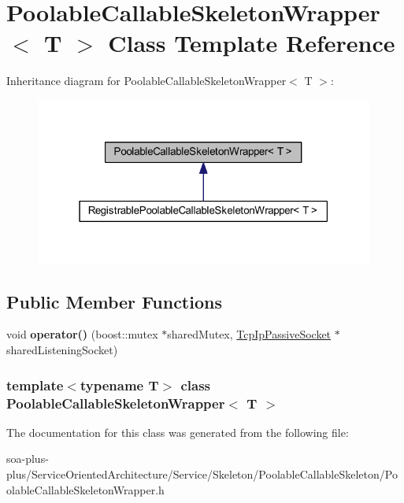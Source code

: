 \hypertarget{class_poolable_callable_skeleton_wrapper}{
\section{PoolableCallableSkeletonWrapper$<$ T $>$ Class Template Reference}
\label{class_poolable_callable_skeleton_wrapper}
}


Inheritance diagram for PoolableCallableSkeletonWrapper$<$ T $>$:\nopagebreak
\begin{figure}[H]
\begin{center}
\leavevmode
\includegraphics[width=316pt]{class_poolable_callable_skeleton_wrapper__inherit__graph}
\end{center}
\end{figure}
\subsection*{Public Member Functions}
\begin{DoxyCompactItemize}
\item 
\hypertarget{class_poolable_callable_skeleton_wrapper_a32cc7b11ded2f63bc833dbc349a72549}{
void {\bfseries operator()} (boost::mutex $\ast$sharedMutex, \hyperlink{class_tcp_ip_passive_socket}{TcpIpPassiveSocket} $\ast$sharedListeningSocket)}
\label{class_poolable_callable_skeleton_wrapper_a32cc7b11ded2f63bc833dbc349a72549}

\end{DoxyCompactItemize}
\subsubsection*{template$<$typename T$>$ class PoolableCallableSkeletonWrapper$<$ T $>$}



The documentation for this class was generated from the following file:\begin{DoxyCompactItemize}
\item 
soa-\/plus-\/plus/ServiceOrientedArchitecture/Service/Skeleton/PoolableCallableSkeleton/PoolableCallableSkeletonWrapper.h\end{DoxyCompactItemize}
